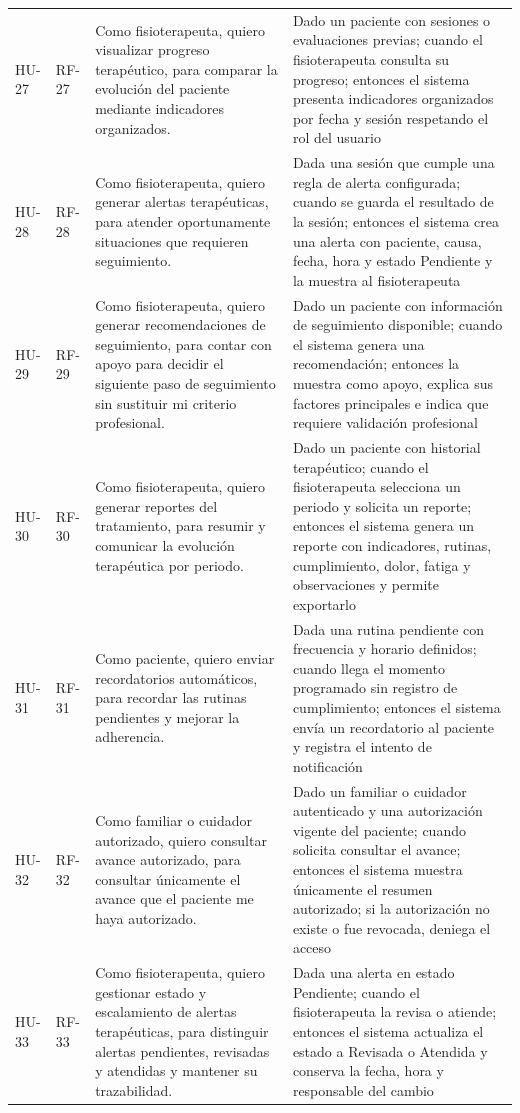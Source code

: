 \documentclass[12pt,a4paper]{article}
\begin{document}
\begin{longtable}{p{}p{}p{}p{}}
HU-27 & RF-27 & Como fisioterapeuta, quiero visualizar progreso terapéutico, para comparar la evolución del paciente mediante indicadores organizados. & Dado un paciente con sesiones o evaluaciones previas; cuando el fisioterapeuta consulta su progreso; entonces el sistema presenta indicadores organizados por fecha y sesión respetando el rol del usuario \\
HU-28 & RF-28 & Como fisioterapeuta, quiero generar alertas terapéuticas, para atender oportunamente situaciones que requieren seguimiento. & Dada una sesión que cumple una regla de alerta configurada; cuando se guarda el resultado de la sesión; entonces el sistema crea una alerta con paciente, causa, fecha, hora y estado Pendiente y la muestra al fisioterapeuta \\
HU-29 & RF-29 & Como fisioterapeuta, quiero generar recomendaciones de seguimiento, para contar con apoyo para decidir el siguiente paso de seguimiento sin sustituir mi criterio profesional. & Dado un paciente con información de seguimiento disponible; cuando el sistema genera una recomendación; entonces la muestra como apoyo, explica sus factores principales e indica que requiere validación profesional \\
HU-30 & RF-30 & Como fisioterapeuta, quiero generar reportes del tratamiento, para resumir y comunicar la evolución terapéutica por periodo. & Dado un paciente con historial terapéutico; cuando el fisioterapeuta selecciona un periodo y solicita un reporte; entonces el sistema genera un reporte con indicadores, rutinas, cumplimiento, dolor, fatiga y observaciones y permite exportarlo \\
HU-31 & RF-31 & Como paciente, quiero enviar recordatorios automáticos, para recordar las rutinas pendientes y mejorar la adherencia. & Dada una rutina pendiente con frecuencia y horario definidos; cuando llega el momento programado sin registro de cumplimiento; entonces el sistema envía un recordatorio al paciente y registra el intento de notificación \\
HU-32 & RF-32 & Como familiar o cuidador autorizado, quiero consultar avance autorizado, para consultar únicamente el avance que el paciente me haya autorizado. & Dado un familiar o cuidador autenticado y una autorización vigente del paciente; cuando solicita consultar el avance; entonces el sistema muestra únicamente el resumen autorizado; si la autorización no existe o fue revocada, deniega el acceso \\
HU-33 & RF-33 & Como fisioterapeuta, quiero gestionar estado y escalamiento de alertas terapéuticas, para distinguir alertas pendientes, revisadas y atendidas y mantener su trazabilidad. & Dada una alerta en estado Pendiente; cuando el fisioterapeuta la revisa o atiende; entonces el sistema actualiza el estado a Revisada o Atendida y conserva la fecha, hora y responsable del cambio \\
\bottomrule\end{longtable}\normalsize
\end{document}
